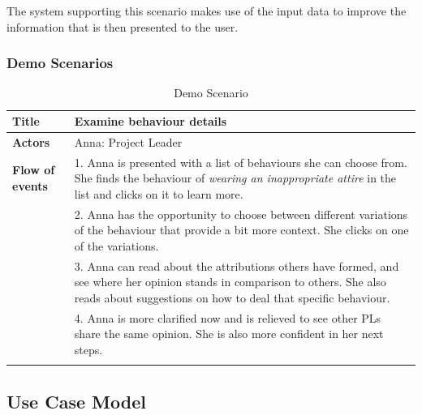 The system supporting this scenario makes use of the input data to improve the information that is then presented to the user.

\subsubsection{Demo Scenarios}


\begin{longtable}[ht]{ p{}  p{} }
\caption{Demo Scenario}
\label{tab:hiding}\\
\hline
\textbf{Title} & Examine behaviour details \\
    \hline
   \textbf{Actors} & Anna: Project Leader \\
   \hline
   \textbf{Flow of events } &  1. Anna is presented with a list of behaviours she can choose from. She finds the behaviour of \textit{wearing an inappropriate attire} in the list and clicks on it to learn more. \\
   & 2. Anna has the opportunity to choose between different variations of the behaviour that provide a bit more context. She clicks on one of the variations. \\
   & 3. Anna can read about the attributions others have formed, and see where her opinion stands in comparison to others. She also reads about suggestions on how to deal that specific behaviour. \\
   & 4. Anna is more clarified now and is relieved to see other PLs share the same opinion. She is also more confident in her next steps.  \\
   \hline
\label{tab:multicol}
\end{longtable}
\subsection{Use Case Model}


